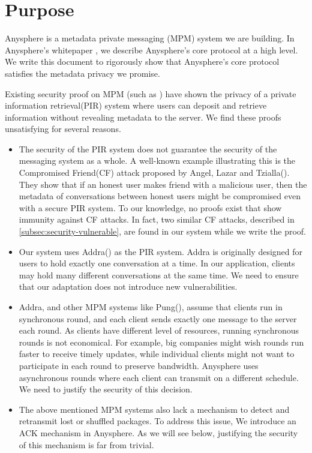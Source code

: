\section{Purpose}
\label{sec:purpose}
Anysphere is a metadata private messaging (MPM) system we are building. In Anysphere's whitepaper \cite[Section 3]{whitepaper}, we describe Anysphere's core protocol at a high level. We write this document to rigorously show that Anysphere's core protocol satisfies the metadata privacy we promise.

Existing security proof on MPM (such as \cite{corrigan2010dissent, corrigan2015riposte, angel2016unobservable, ahmad2021addra}) have shown the privacy of a private information retrieval(PIR) system where users can deposit and retrieve information without revealing metadata to the server. We find these proofs unsatisfying for several reasons.
\begin{itemize}
    \item The security of the PIR system does not guarantee the security of the messaging system as a whole. A well-known example illustrating this is the Compromised Friend(CF) attack proposed by Angel, Lazar and Tzialla(\cite{angel2018cf}). They show that if an honest user makes friend with a malicious user, then the metadata of conversations between honest users might be compromised even with a secure PIR system. To our knowledge, no proofs exist that show immunity against CF attacks. In fact, two similar CF attacks, described in \cref{subsec:security-vulnerable}, are found in our system while we write the proof.
    
    \item Our system uses Addra(\cite{ahmad2021addra}) as the PIR system. Addra is originally designed for users to hold exactly one conversation at a time. In our application, clients may hold many different conversations at the same time. We need to ensure that our adaptation does not introduce new vulnerabilities.
    
    \item Addra, and other MPM systems like Pung(\cite{angel2016unobservable}), assume that clients run in synchronous round, and each client sends exactly one message to the server each round. As clients have different level of resources, running synchronous rounds is not economical. For example, big companies might wish rounds run faster to receive timely updates, while individual clients might not want to participate in each round to preserve bandwidth. Anysphere uses asynchronous rounds where each client can transmit on a different schedule. We need to justify the security of this decision.
    
    \item The above mentioned MPM systems also lack a mechanism to detect and retransmit lost or shuffled packages. To address this issue, We introduce an ACK mechanism in Anysphere. As we will see below, justifying the security of this mechanism is far from trivial.
\end{itemize}

